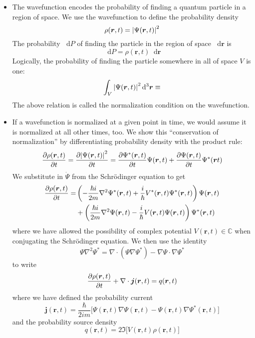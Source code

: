 \documentclass[11pt, a4paper]{article}
\newcommand{\diff}{\mathop{}\!\mathrm{d}} %
\newcommand{\dr}{\diff^{3} \r}  %
\renewcommand{\div}{\nabla \cdot}
\renewcommand{\grad}{\nabla}
\renewcommand{\laplacian}{\nabla^{2}}
\newcommand{\Schro}{Schr\"{o}dinger\xspace}
\renewcommand{\vec}[1]{\bm{#1}}  %
\renewcommand{\r}{\vec{r}}  %
\renewcommand{\P}{\Psi}  %
\begin{document}
\begin{itemize}
	\item The wavefunction encodes the probability of finding a quantum particle in a region of space. We use the wavefunction to define the probability density
	\begin{equation*}
		\rho (\r, t) = \abs{\P(\r, t)}^{2}
	\end{equation*}
	The probability $ \diff P $ of finding the particle in the region of space $ \diff \r $ is
	\begin{equation*}
		\diff P = \rho(\r, t) \diff \r
	\end{equation*}
	Logically, the probability of finding the particle somewhere in all of space $ V $ is one:
	\begin{equation*}
		\int_{V} \abs{\P(\r, t)}^{2}\dr \equiv
	\end{equation*}
	The above relation is called the normalization condition on the wavefunction.
	
	\item If a wavefunction is normalized at a given point in time, we would assume it is normalized at all other times, too. We show this ``conservation of normalization'' by differentiating probability density with the product rule:
	\begin{align*}
		  \pdv{\rho(\r, t)}{t} = \pdv{\abs{\P(\r, t)}^{2}}{t} &= \pdv{\P^{*}(\r, t)}{t} \P(\r, t) + \pdv{\P(\r, t)}{t} \P^{*}(\r t)\\
	\end{align*}
	We substitute in $ \dot{\P} $ from the \Schro equation to get
	\begin{align*}
		\pdv{\rho(\r, t)}{t} = &\left(- \frac{\hbar i}{2m}\laplacian \P^{*}(\r, t) + \frac{i}{\hbar} V^{*}(\r, t)\Psi^{*}(\r, t)\right)\P(\r, t) \\
		& + \left(\frac{\hbar i}{2m}\laplacian \P(\r, t) - \frac{i}{\hbar} V(\r, t)\Psi(\r, t)\right)\Psi^{*}(\r, t)
	\end{align*}
	where we have allowed the possibility of complex potential $ V(\r, t) \in \mathbb{C} $ when conjugating the \Schro equation. We then use the identity
	\begin{equation*}
		\P \laplacian \P^{*} = \div (\P \grad \P^{*}) - \grad \P \cdot \grad \P^{*}
	\end{equation*}
	to write 
	\begin{equation*}
		\pdv{\rho(\r, t)}{t} + \div \vec{j}(\r, t) = q(\r, t)
	\end{equation*}
	where we have defined the probability current
	\begin{equation*}
		\vec{j}(\r, t) = \frac{\hbar}{2im}\big[\P(\r, t)\grad\P(\r, t) - \P(\r, t)\grad\P^{*}(\r, t)\big]
	\end{equation*}
	and the probability source density
	\begin{equation*}
		q(\r, t) = 2 \Im \big[V(\r, t)\rho(\r, t)\big]
	\end{equation*}
	

\end{itemize}
\end{document}

